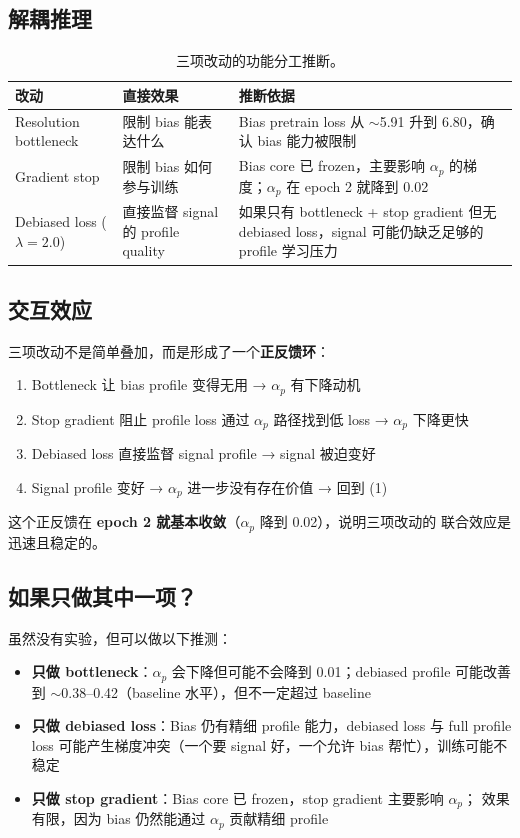 \documentclass[11pt,a4paper]{ctexart}
\begin{document}
\subsection{解耦推理}

\begin{table}[H]
\centering
\small
\caption{三项改动的功能分工推断。}
\begin{tabular}{p{3.2cm}p{4.5cm}p{5cm}}
\toprule
改动 & 直接效果 & 推断依据 \\
\midrule
Resolution bottleneck & 限制 bias 能表达什么 & Bias pretrain loss 从 $\sim$5.91 升到 6.80，确认 bias 能力被限制 \\
\addlinespace
Gradient stop & 限制 bias 如何参与训练 & Bias core 已 frozen，主要影响 $\alpha_p$ 的梯度；$\alpha_p$ 在 epoch 2 就降到 0.02 \\
\addlinespace
Debiased loss ($\lambda=2.0$) & 直接监督 signal 的 profile quality & 如果只有 bottleneck + stop gradient 但无 debiased loss，signal 可能仍缺乏足够的 profile 学习压力 \\
\bottomrule
\end{tabular}
\end{table}

\subsection{交互效应}

三项改动不是简单叠加，而是形成了一个\textbf{正反馈环}：

\begin{enumerate}[leftmargin=2em]
  \item Bottleneck 让 bias profile 变得无用 → $\alpha_p$ 有下降动机
  \item Stop gradient 阻止 profile loss 通过 $\alpha_p$ 路径找到低 loss → $\alpha_p$ 下降更快
  \item Debiased loss 直接监督 signal profile → signal 被迫变好
  \item Signal profile 变好 → $\alpha_p$ 进一步没有存在价值 → 回到 (1)
\end{enumerate}

这个正反馈在 \textbf{epoch 2 就基本收敛}（$\alpha_p$ 降到 0.02），说明三项改动的
联合效应是迅速且稳定的。

\subsection{如果只做其中一项？}

虽然没有实验，但可以做以下推测：
\begin{itemize}[leftmargin=2em]
  \item \textbf{只做 bottleneck}：$\alpha_p$ 会下降但可能不会降到 0.01；debiased profile 可能改善
  到 $\sim$0.38--0.42（baseline 水平），但不一定超过 baseline
  \item \textbf{只做 debiased loss}：Bias 仍有精细 profile 能力，debiased loss 与 full profile loss
  可能产生梯度冲突（一个要 signal 好，一个允许 bias 帮忙），训练可能不稳定
  \item \textbf{只做 stop gradient}：Bias core 已 frozen，stop gradient 主要影响 $\alpha_p$；
  效果有限，因为 bias 仍然能通过 $\alpha_p$ 贡献精细 profile
\end{itemize}
\end{document}
